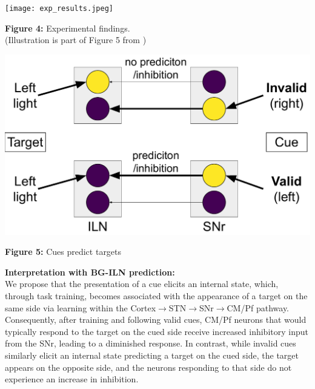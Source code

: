 \documentclass[portrait,final,a0paper,fontscale=0.30]{baposter}
\begin{document}
\begin{poster}
{\begin{adjustbox}{minipage=\textwidth, margin=2pt, center}
\begin{minipage}{0.25\textwidth}
\begin{center}
            \vspace{5pt}
            
            \texttt{[image: exp\_results.jpeg]}
            
            \textbf{Figure 4:} Experimental findings. \\
            {\fontsize{4pt}{4.8pt}\selectfont (Illustration is part of Figure 5 from \parencite{minamimoto_participation_2002})} \\
        \end{center}
	\end{minipage}
    \hspace{0.01\textwidth}
	\begin{minipage}{0.25\textwidth}
        \centering
        \includegraphics[width=\linewidth]{figures/exp_interpretation.pdf}
        
        \textbf{Figure 5:} Cues predict targets
	\end{minipage}
    \hspace{0.01\textwidth}
	\begin{minipage}{0.18\textwidth}        
        \textbf{Interpretation with BG-ILN prediction:}\\
        We propose that the presentation of a cue elicits an internal state, which, through task training, becomes associated with the appearance of a target on the same side via learning within the Cortex$\rightarrow$STN$\rightarrow$SNr$\rightarrow$CM/Pf pathway. Consequently, after training and following valid cues, CM/Pf neurons that would typically respond to the target on the cued side receive increased inhibitory input from the SNr, leading to a diminished response. In contrast, while invalid cues similarly elicit an internal state predicting a target on the cued side, the target appears on the opposite side, and the neurons responding to that side do not experience an increase in inhibition.
	\end{minipage}
    \hfill
	

\end{adjustbox}}
\end{poster}
\end{document}
